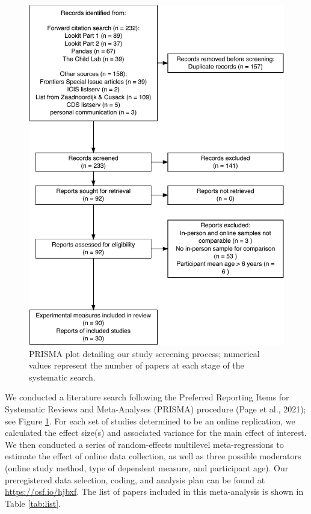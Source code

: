 \documentclass[
  man,floatsintext]{apa6}
\begin{document}
\begin{figure}
\centering
\includegraphics{OnlineMA_main_files/figure-latex/prisma-1.pdf}
\caption{\label{fig:prisma}PRISMA plot detailing our study screening process; numerical values represent the number of papers at each stage of the systematic search.}
\end{figure}

We conducted a literature search following the Preferred Reporting Items for Systematic Reviews and Meta-Analyses (PRISMA) procedure (Page et al., 2021); see Figure \ref{fig:prisma}. For each set of studies determined to be an online replication, we calculated the effect size(s) and associated variance for the main effect of interest. We then conducted a series of random-effects multilevel meta-regressions to estimate the effect of online data collection, as well as three possible moderators (online study method, type of dependent measure, and participant age). Our preregistered data selection, coding, and analysis plan can be found at \href{}{https://osf.io/hjbxf}. The list of papers included in this meta-analysis is shown in Table \ref{tab:list}.
\end{document}
